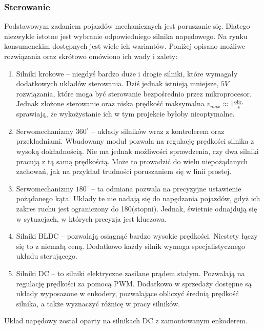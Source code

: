         \subsubsection{Sterowanie}
        \label{sec:engines}
            Podstawowym zadaniem pojazdów mechanicznych jest poruszanie się.
            Dlatego niezwykle istotne jest wybranie odpowiedniego silnika napędowego.
            Na rynku konsumenckim dostępnych jest wiele ich wariantów.
            Poniżej opisano możliwe rozwiązania oraz skrótowo omówiono ich wady i zalety:
            \begin{enumerate}
                \item Silniki krokowe -- niegdyś bardzo duże i drogie silniki, które wymagały dodatkowych układów sterowania.
                Dziś jednak istnieją mniejsze, $5V$ rozwiązania, które moga być sterowanie bezpośrednio przez mikroprocesor.
                Jednak złożone sterowanie oraz niska prędkość maksymalna $v_{max} \approx 1 \frac{\text{obr.}}{s}$ sprawiają, że wykożystanie ich w tym projekcie byłoby nieoptymalne.
                \item Serwomechanizmy $360^\circ$ -- układy silników wraz z kontrolerem oraz przekładniami. Wbudowany moduł pozwala na regulację prędkości silnika z wysoką dokładnością.
                Nie ma jednak możliwości sprawdzenia, czy dwa silniki pracują z tą samą prędkością. Może to prowadzić do wielu niepożądanych zachowań, jak na przykład trudności poruszaniem się w linii prostej.
                \item Serwomechanizmy $180^\circ$ -- ta odmiana pozwala na precyzyjne ustawienie pożądanego kąta.
                Układy te nie nadają się do napędzania pojazdów, gdyż ich zakres ruchu jest ograniczony do 180(stopni). Jednak, świetnie odnajdują się w sytuacjach, w których precyzja jest kluczowa.
                \item Silniki BLDC -- pozwalają osiągnąć bardzo wysokie prędkości.
                Niestety łączy się to z niemałą ceną. Dodatkowo każdy silnik wymaga specjalistycznego układu sterującego.
                \item Silniki DC -- to silniki elektryczne zasilane prądem stałym. Pozwalają na regulację prędkości za pomocą PWM.
                Dodatkowo w sprzedaży dostępne są układy wyposazone w enkodery, pozwalające obliczyć średnią prędkość silnika,
                a także wyznaczyć różnicę w pracy silników.
            \end{enumerate}
            Układ napędowy został oparty na silnikach DC z zamontowanym enkoderem.
